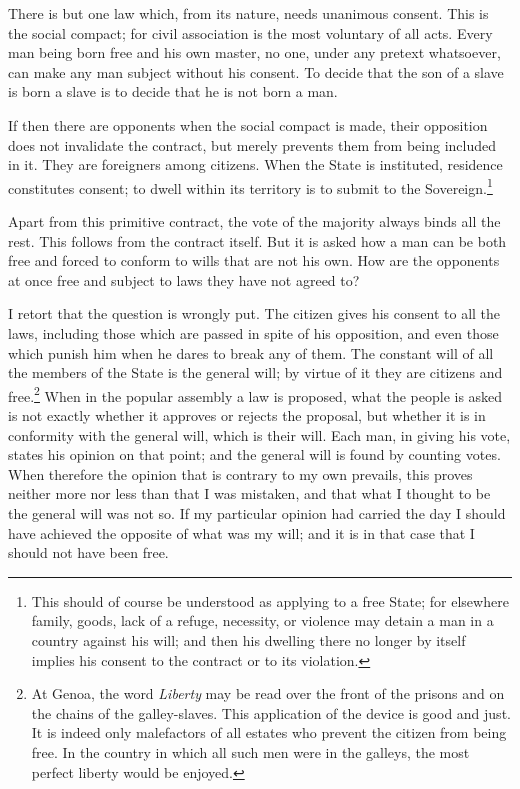 \documentclass[12pt]{report}
\begin{document}
There is but one law which, from its nature, needs unanimous consent. This is the social compact; for civil association is the most voluntary of all acts. Every man being born free and his own master, no one, under any pretext whatsoever, can make any man subject without his consent. To decide that the son of a slave is born a slave is to decide that he is not born a man.

If then there are opponents when the social compact is made, their opposition does not invalidate the contract, but merely prevents them from being included in it. They are foreigners among citizens. When the State is instituted, residence constitutes consent; to dwell within its territory is to submit to the Sovereign.\footnote{This should of course be understood as applying to a free State; for elsewhere family, goods, lack of a refuge, necessity, or violence may detain a man in a country against his will; and then his dwelling there no longer by itself implies his consent to the contract or to its violation.}

Apart from this primitive contract, the vote of the majority always binds all the rest. This follows from the contract itself. But it is asked how a man can be both free and forced to conform to wills that are not his own. How are the opponents at once free and subject to laws they have not agreed to?

I retort that the question is wrongly put. The citizen gives his consent to all the laws, including those which are passed in spite of his opposition, and even those which punish him when he dares to break any of them. The constant will of all the members of the State is the general will; by virtue of it they are citizens and free.\footnote{At Genoa, the word \textit{Liberty} may be read over the front of the prisons and on the chains of the galley-slaves. This application of the device is good and just. It is indeed only malefactors of all estates who prevent the citizen from being free. In the country in which all such men were in the galleys, the most perfect liberty would be enjoyed.} When in the popular assembly a law is proposed, what the people is asked is not exactly whether it approves or rejects the proposal, but whether it is in conformity with the general will, which is their will. Each man, in giving his vote, states his opinion on that point; and the general will is found by counting votes. When therefore the opinion that is contrary to my own prevails, this proves neither more nor less than that I was mistaken, and that what I thought to be the general will was not so. If my particular opinion had carried the day I should have achieved the opposite of what was my will; and it is in that case that I should not have been free.
\end{document}
